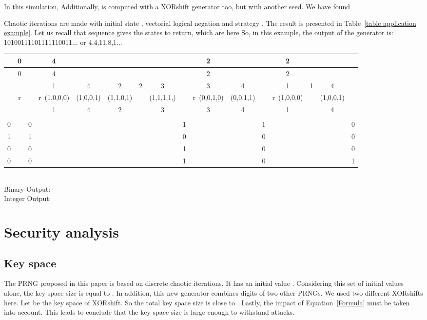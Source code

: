 \documentclass[10pt, a4paper, conference, compsocconf]{IEEEtran}
\begin{document}
In this simulation,  Additionally,  is computed with a XORshift generator too, but with another seed. We have found 

Chaotic iterations are made with initial state , vectorial logical negation  and 
strategy . The result is presented in Table~\ref{table application example}. Let us recall that sequence  gives the states  to return, which are here  So, in this example, the output of the generator is: 10100111101111110011... or 4,4,11,8,1... 

\begin{tiny}
\begin{table*}[!t]
\centering
\begin{tabular}{|c|cc|cccccc|ccc|cccc|}
\hline
 &0 & &4 & & & & & &2& &&2&&  &  \\ \hline
 &0 & &4 & & & & & &2& &&2&&  &  \\ \hline
  &  & &1 &4&2&\underline{2}       &3& &3&4&&1&\underline{1}      &4&\\ \hline
  &r  & &r~(1,0,0,0)&(1,0,0,1) &(1,1,0,1)& &(1,1,1,1,)&&r~(0,0,1,0) &(0,0,1,1) &&r~(1,0,0,0) & &(1,0,0,1)  &  \\ \hline
  &  & &1 &4&2&        &3& &3&4&&1& &4 &  \\ \hline
 &  & & & &  
&  & & & & &   
& & &&  \\
0 & &0 & & &
 & &   &1   & & &
1 & & & & 0\\
1 &  &1 &   &   &
 & & &0 & & &
0 & &  &&0\\
0 & &0 & & &
 & & &1 & & &
0 &   & & &0  \\
0 & &0  & & &
 & & &1 & & &
0 & & &&1 \\
\hline
\end{tabular}\\
\vspace{0.5cm}
Binary Output: \\
Integer Output:

\caption{Application example}
\label{table application example}
\end{table*}
\end{tiny}



\section{Security analysis}
\label{Security analysis}
\subsection{Key space}
The PRNG proposed in this paper is based on discrete chaotic iterations. It has an initial 
value . Considering this set of initial values alone, the key space size 
is equal to . In addition, this new generator combines digits of two other PRNGs. We used two different XORshifts here. Let  be the key space of XORshift. So the total key space 
size is close to . Lastly, the impact of Equation~\ref{Formula} must be 
taken into account.
This leads to conclude that the key space size is large enough to withstand 
attacks.
\end{document}
